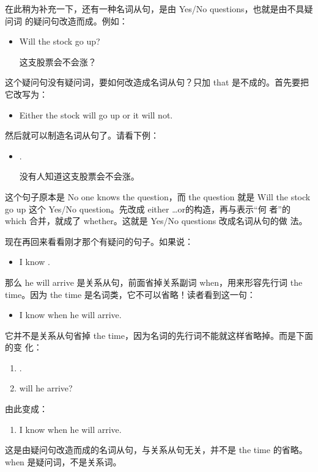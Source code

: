 在此稍为补充一下，还有一种名词从句，是由 Yes/No questions，也就是由不具疑问词
的疑问句改造而成。例如：
\begin{itemize}
\item Will the stock go up?

  这支股票会不会涨？
\end{itemize}
这个疑问句没有疑问词，要如何改造成名词从句？只加 that
是不成的。首先要把它改写为：
\begin{itemize}
\item Either the stock will go up or it will not.
\end{itemize}
然后就可以制造名词从句了。请看下例：
\begin{itemize}
\item {}  .

  没有人知道这支股票会不会涨。
\end{itemize}
这个句子原本是 No one knows the question，而 the question 就是 Will the
stock go up 这个 Yes/No question。先改成 either \ldots or的构造，再与表示“何
者”的 which 合并，就成了 whether。这就是 Yes/No questions 改成名词从句的做
法。

现在再回来看看刚才那个有疑问的句子。如果说：
\begin{itemize}
\item I know  .
\end{itemize}
那么 he will arrive 是关系从句，前面省掉关系副词 when，用来形容先行词
the time。因为 the time 是名词类，它不可以省略！读者看到这一句：
\begin{itemize}
\item   I know when he will arrive.
\end{itemize}
它并不是关系从句省掉 the time，因为名词的先行词不能就这样省略掉。而是下面的变
化：
\begin{enumerate}
\item {}  .
\item {} will he arrive?
\end{enumerate}

由此变成：
\begin{enumerate}[resume]
\item I know when he will arrive.
\end{enumerate}
这是由疑问句改造而成的名词从句，与关系从句无关，并不是 the time
的省略。when 是疑问词，不是关系词。

